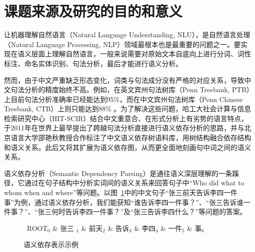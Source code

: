 \section{课题来源及研究的目的和意义}

让机器理解自然语言（Natural Language Understanding, NLU），是自然语言处理（Natural Language Processing, NLP）领域最根本也是最重要的问题之一。要实现在语义层面上理解自然语言，一般来说需要对原始文本自底向上进行分词、词性标注、命名实体识别、句法分析，最后才能进行语义分析。

然而，由于中文严重缺乏形态变化，词类与句法成分没有严格的对应关系，导致中文句法分析的精度始终不高。例如，在英文宾州句法树库（Penn Treebank, PTB）上目前句法分析准确率已经能达到95\%，而在中文宾州句法树库（Penn Chinese Treebank, CTB）上则只能达到88\% 。为了解决这些问题，哈工大社会计算与信息检索研究中心（HIT-SCIR）结合中文重意合、在形式分析上有劣势的语言特点，于2011年在世界上最早提出了跨越句法分析直接进行语义依存分析的思路，并与北京语言大学邵艳秋教授合作标注了中文语义依存树语料库，用树结构融合依存结构和语义关系。此后又将其扩展为语义依存图，从而更全面地刻画句中词之间的语义关系。

语义依存分析（Semantic Dependency Parsing）是通往语义深层理解的一条蹊径，它通过在句子结构中分析实词间的语义关系来回答句子中“Who did what to whom when and where”等问题。以图~\ref{fig:sdp0}中的中文句子“张三前天告诉李四一件事”为例，通过语义依存分析，我们能获知“谁告诉李四一件事？”、“张三告诉谁一件事？”、“张三何时告诉李四一件事？”及“张三告诉李四什么？”等问题的答案。

\begin{figure}[tb]
	\begin{center}
		\begin{small}
			\begin{dependency}[arc edge, arc angle=80, text only label, label style={above}]
				\begin{deptext} [row sep=0.4cm, column sep=.1cm]
					\ ROOT$_0$ \& 张三 $_1$ \& 前天$_2$ \& 告诉$_3$ \&  李四$_4$  \& 一件$_5$ \& 事$_6$ \\
				\end{deptext}
			\end{dependency}
			\caption{语义依存表示示例}\label{fig:sdp0}
		\end{small}
	\end{center}
\end{figure}

